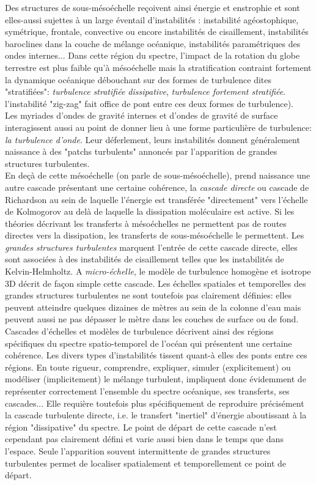 Des structures de sous-mésoéchelle reçoivent ainsi énergie et enstrophie et sont elles-aussi sujettes à un large éventail d'instabilités \citep{mcwilliams_submesoscale_2016}: instabilité agéostophique, symétrique, frontale, convective ou encore instabilités de cisaillement, instabilités baroclines dans la couche de mélange océanique, instabilités paramétriques des ondes internes... Dans cette région du spectre, l'impact de la rotation du globe terrestre est plus faible qu'à mésoéchelle mais la stratification contraint fortement la dynamique océanique débouchant sur des formes de turbulence dites "stratifiées": \textit{turbulence stratifiée dissipative}, \textit{turbulence fortement stratifiée}. l'instabilité "zig-zag" fait office de pont entre ces deux formes de turbulence).\\
Les myriades d'ondes de gravité internes et d'ondes de gravité de surface interagissent aussi au point de donner lieu à une forme particulière de turbulence: \textit{la turbulence d'onde}. Leur déferlement, leurs instabilités donnent généralement naissance à des "patchs turbulents" annoncés par l'apparition de grandes structures turbulentes.\\
En deçà de cette mésoéchelle (on parle de sous-mésoéchelle), prend naissance une autre cascade présentant une certaine cohérence, la \textit{cascade directe} ou cascade de Richardson au sein de laquelle l'énergie est transférée "directement" vers l'échelle de Kolmogorov au delà de laquelle la dissipation moléculaire est active. Si les théories décrivant les transferts à mésoéchelles ne permettent pas de routes directes vers la dissipation, les transferts de sous-mésoéchelle le permettent.
Les \textit{grandes structures turbulentes} marquent l'entrée de cette cascade directe, elles sont associées à des instabilités de cisaillement telles que les instabilités de Kelvin-Helmholtz. A \textit{micro-échelle}, le modèle de turbulence homogène et isotrope 3D décrit de façon simple cette cascade. Les échelles spatiales et temporelles des grandes structures turbulentes ne sont toutefois pas clairement définies: elles peuvent atteindre quelques dizaines de mètres au sein de la colonne d'eau mais peuvent aussi ne pas dépasser le mètre dans les couches de surface ou de fond.\\
Cascades d'échelles et modèles de turbulence décrivent ainsi des régions spécifiques du spectre spatio-temporel de l'océan qui présentent une certaine cohérence. Les divers types d'instabilités tissent quant-à elles des ponts entre ces régions. En toute rigueur, comprendre, expliquer, simuler (explicitement) ou modéliser (implicitement) le mélange turbulent, impliquent donc évidemment de représenter correctement l'ensemble du spectre océanique, ses transferts, ses cascades... Elle requière toutefois plus spécifiquement de reproduire précisément la cascade turbulente directe, i.e. le transfert "inertiel" d'énergie aboutissant à la région "dissipative" du spectre. Le point de départ de cette cascade n'est cependant pas clairement défini et varie aussi bien dans le temps que dans l'espace. Seule l'apparition souvent intermittente de grandes structures turbulentes permet de localiser spatialement et temporellement ce point de départ.\\
